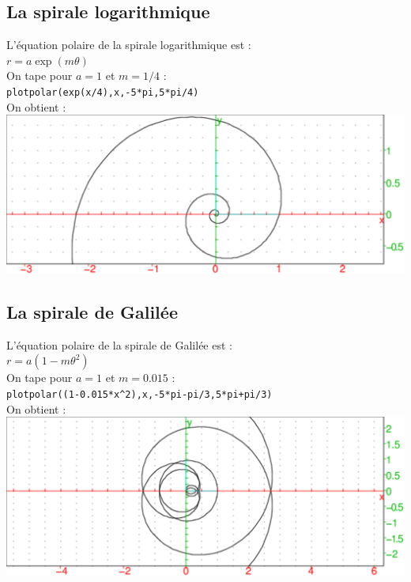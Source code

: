 \documentclass[a4paper,11pt]{book}
\begin{document}
\subsection{La spirale logarithmique}
L'\'equation polaire de la spirale  logarithmique est :\\
$r=a\exp(m\theta)$\\
On tape pour $a=1$ et $m=1/4$ :\\
{\tt plotpolar(exp(x/4),x,-5*pi,5*pi/4)}\\
On obtient :\\
\includegraphics[width=\textwidth]{spiral2}
\subsection{La spirale de Galil\'ee}
L'\'equation polaire de la spirale de Galil\'ee est :\\
$r=a(1-m\theta^2)$\\
On tape pour $a=1$ et $m=0.015$ :\\
{\tt plotpolar((1-0.015*x\verb|^|2),x,-5*pi-pi/3,5*pi+pi/3)}\\
On obtient :\\
\includegraphics[width=\textwidth]{spiral3}
\end{document}
